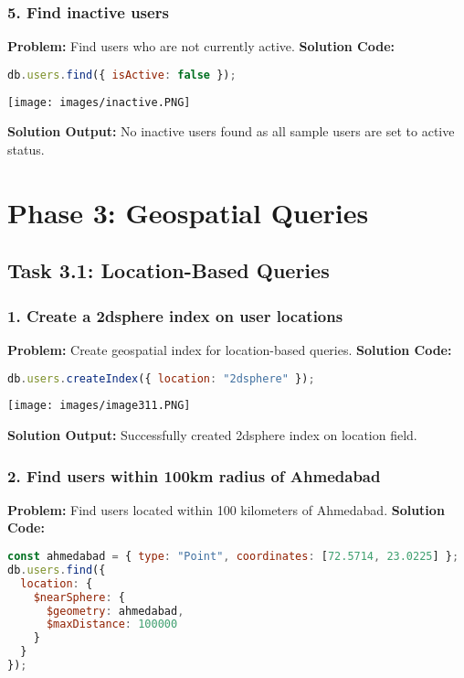 \documentclass[12pt,a4paper]{article}
\begin{document}
\subsubsection{5. Find inactive users}
\textbf{Problem:} Find users who are not currently active.
\textbf{Solution Code:}
\begin{lstlisting}[language=JavaScript]
db.users.find({ isActive: false });
\end{lstlisting}

\begin{center}
\texttt{[image: images/inactive.PNG]}
\end{center}
\textbf{Solution Output:} No inactive users found as all sample users are set to active status.

\section{Phase 3: Geospatial Queries}
\subsection{Task 3.1: Location-Based Queries}
\subsubsection{1. Create a 2dsphere index on user locations}
\textbf{Problem:} Create geospatial index for location-based queries.
\textbf{Solution Code:}
\begin{lstlisting}[language=JavaScript]
db.users.createIndex({ location: "2dsphere" });
\end{lstlisting}

\begin{center}
\texttt{[image: images/image311.PNG]}
\end{center}
\textbf{Solution Output:} Successfully created 2dsphere index on location field.

\subsubsection{2. Find users within 100km radius of Ahmedabad}
\textbf{Problem:} Find users located within 100 kilometers of Ahmedabad.
\textbf{Solution Code:}
\begin{lstlisting}[language=JavaScript]
const ahmedabad = { type: "Point", coordinates: [72.5714, 23.0225] };
db.users.find({
  location: {
    $nearSphere: {
      $geometry: ahmedabad,
      $maxDistance: 100000
    }
  }
});
\end{lstlisting}
\end{document}
